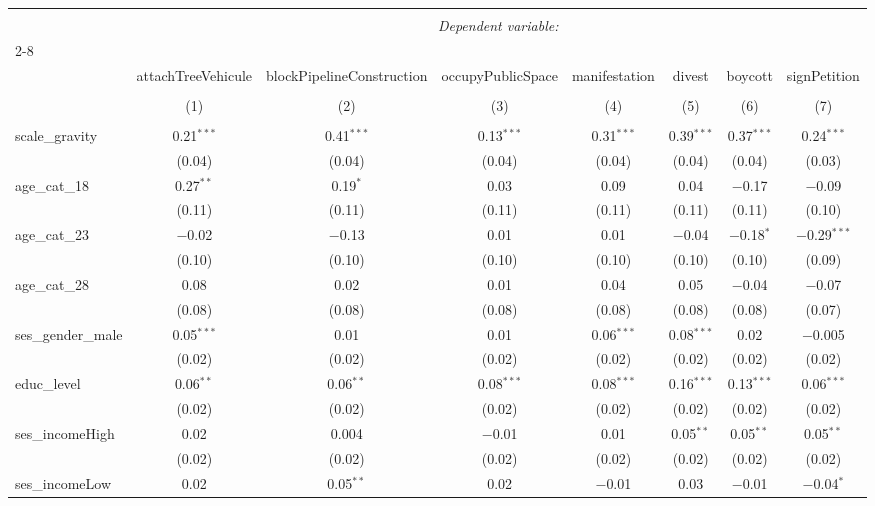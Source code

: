 \documentclass[
]{article}
\begin{document}
\begin{sidewaystable}[!htbp] \centering 
  \caption{Sans interaction 2} 
  \label{} 
\begin{tabular}{@{\extracolsep{1pt}}lccccccc} 
\\[-1.8ex]\hline 
\hline \\[-1.8ex] 
 & \multicolumn{7}{c}{\textit{Dependent variable:}} \\ 
\cline{2-8} 
\\[-1.8ex] & attachTreeVehicule & blockPipelineConstruction & occupyPublicSpace & manifestation & divest & boycott & signPetition \\ 
\\[-1.8ex] & (1) & (2) & (3) & (4) & (5) & (6) & (7)\\ 
\hline \\[-1.8ex] 
 scale\_gravity & 0.21$^{***}$ & 0.41$^{***}$ & 0.13$^{***}$ & 0.31$^{***}$ & 0.39$^{***}$ & 0.37$^{***}$ & 0.24$^{***}$ \\ 
  & (0.04) & (0.04) & (0.04) & (0.04) & (0.04) & (0.04) & (0.03) \\ 
  age\_cat\_18 & 0.27$^{**}$ & 0.19$^{*}$ & 0.03 & 0.09 & 0.04 & $-$0.17 & $-$0.09 \\ 
  & (0.11) & (0.11) & (0.11) & (0.11) & (0.11) & (0.11) & (0.10) \\ 
  age\_cat\_23 & $-$0.02 & $-$0.13 & 0.01 & 0.01 & $-$0.04 & $-$0.18$^{*}$ & $-$0.29$^{***}$ \\ 
  & (0.10) & (0.10) & (0.10) & (0.10) & (0.10) & (0.10) & (0.09) \\ 
  age\_cat\_28 & 0.08 & 0.02 & 0.01 & 0.04 & 0.05 & $-$0.04 & $-$0.07 \\ 
  & (0.08) & (0.08) & (0.08) & (0.08) & (0.08) & (0.08) & (0.07) \\ 
  ses\_gender\_male & 0.05$^{***}$ & 0.01 & 0.01 & 0.06$^{***}$ & 0.08$^{***}$ & 0.02 & $-$0.005 \\ 
  & (0.02) & (0.02) & (0.02) & (0.02) & (0.02) & (0.02) & (0.02) \\ 
  educ\_level & 0.06$^{**}$ & 0.06$^{**}$ & 0.08$^{***}$ & 0.08$^{***}$ & 0.16$^{***}$ & 0.13$^{***}$ & 0.06$^{***}$ \\ 
  & (0.02) & (0.02) & (0.02) & (0.02) & (0.02) & (0.02) & (0.02) \\ 
  ses\_incomeHigh & 0.02 & 0.004 & $-$0.01 & 0.01 & 0.05$^{**}$ & 0.05$^{**}$ & 0.05$^{**}$ \\ 
  & (0.02) & (0.02) & (0.02) & (0.02) & (0.02) & (0.02) & (0.02) \\ 
  ses\_incomeLow & 0.02 & 0.05$^{**}$ & 0.02 & $-$0.01 & 0.03 & $-$0.01 & $-$0.04$^{*}$ \\ 

\end{tabular}
\end{sidewaystable}
\end{document}

